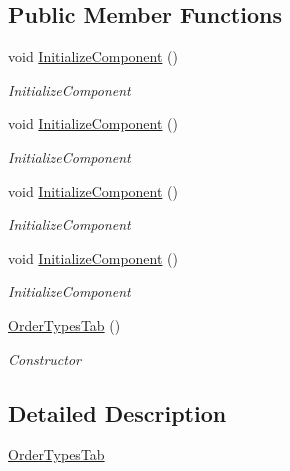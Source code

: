 \subsection*{Public Member Functions}
\begin{DoxyCompactItemize}
\item 
void \hyperlink{class_baudi_1_1_client_1_1_view_1_1_tabs_1_1_order_types_tab_a9abb5a72be77011d02602fece214b33a}{Initialize\+Component} ()
\begin{DoxyCompactList}\small\item\em Initialize\+Component \end{DoxyCompactList}\item 
void \hyperlink{class_baudi_1_1_client_1_1_view_1_1_tabs_1_1_order_types_tab_a9abb5a72be77011d02602fece214b33a}{Initialize\+Component} ()
\begin{DoxyCompactList}\small\item\em Initialize\+Component \end{DoxyCompactList}\item 
void \hyperlink{class_baudi_1_1_client_1_1_view_1_1_tabs_1_1_order_types_tab_a9abb5a72be77011d02602fece214b33a}{Initialize\+Component} ()
\begin{DoxyCompactList}\small\item\em Initialize\+Component \end{DoxyCompactList}\item 
void \hyperlink{class_baudi_1_1_client_1_1_view_1_1_tabs_1_1_order_types_tab_a9abb5a72be77011d02602fece214b33a}{Initialize\+Component} ()
\begin{DoxyCompactList}\small\item\em Initialize\+Component \end{DoxyCompactList}\item 
\hyperlink{class_baudi_1_1_client_1_1_view_1_1_tabs_1_1_order_types_tab_a23d9f0f8c79073333c9b800491c57b00}{Order\+Types\+Tab} ()
\begin{DoxyCompactList}\small\item\em Constructor \end{DoxyCompactList}\end{DoxyCompactItemize}


\subsection{Detailed Description}
\hyperlink{class_baudi_1_1_client_1_1_view_1_1_tabs_1_1_order_types_tab}{Order\+Types\+Tab} 

